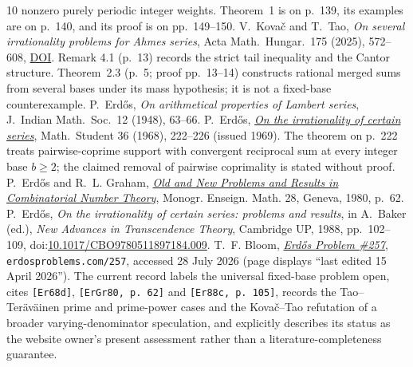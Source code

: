 \documentclass[11pt]{article}
\begin{document}
\begin{thebibliography}{10}
  nonzero purely periodic integer weights.  Theorem~1 is on p.~139, its
  examples are on p.~140, and its proof is on pp.~149--150.
 V.~Kova\v{c} and T.~Tao, \emph{On several irrationality
  problems for Ahmes series}, Acta Math.\ Hungar.\ 175 (2025), 572--608,
  \href{https://doi.org/10.1007/s10474-025-01528-0}{DOI}.  Remark 4.1
  (p.~13) records the strict tail inequality and the Cantor structure.
  Theorem~2.3 (p.~5; proof pp.~13--14) constructs rational merged sums from
  several bases under its mass hypothesis; it is not a fixed-base
  counterexample.
 P.~Erd\H{o}s, \emph{On arithmetical properties of Lambert
  series}, J.~Indian Math.\ Soc.\ 12 (1948), 63--66.
 P.~Erd\H{o}s,
  \href{https://users.renyi.hu/~p_erdos/1969-09.pdf}{\emph{On the
  irrationality of certain series}}, Math.\ Student 36 (1968), 222--226
  (issued 1969).  The theorem on p.~222 treats pairwise-coprime support with
  convergent reciprocal sum at every integer base $b\ge2$; the claimed
  removal of pairwise coprimality is stated without proof.
 P.~Erd\H{o}s and R.~L. Graham,
  \href{https://mathweb.ucsd.edu/~ronspubs/80_11_number_theory.pdf}{\emph{Old
  and New Problems and Results in Combinatorial Number Theory}},
  Monogr. Enseign. Math. 28, Geneva, 1980, p.~62.
 P.~Erd\H{o}s, \emph{On the irrationality of certain
  series: problems and results}, in A.~Baker (ed.), \emph{New Advances in
  Transcendence Theory}, Cambridge UP, 1988, pp.~102--109,
  doi:\href{https://doi.org/10.1017/CBO9780511897184.009}
  {10.1017/CBO9780511897184.009}.
 T.~F. Bloom,
  \href{https://www.erdosproblems.com/257}{\emph{Erd\H{o}s Problem \#257}},
  \texttt{erdosproblems.com/257}, accessed 28 July 2026 (page displays
  ``last edited 15 April 2026'').  The current record labels the universal
  fixed-base problem open, cites \texttt{[Er68d]},
  \texttt{[ErGr80, p.~62]} and \texttt{[Er88c, p.~105]}, records the
  Tao--Ter\"av\"ainen prime and prime-power cases and the Kova\v{c}--Tao
  refutation of a broader varying-denominator speculation, and explicitly
  describes its status as the website owner's present assessment rather than
  a literature-completeness guarantee.
\end{thebibliography}
\end{document}
